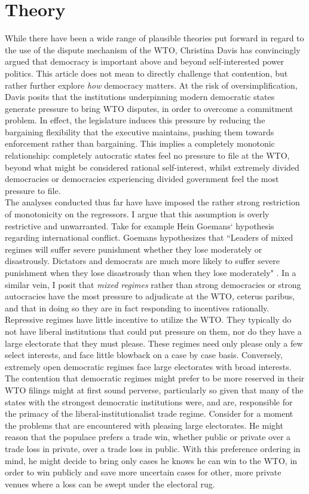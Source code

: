\documentclass[]{article}
\begin{document}
\section{Theory}
While there have been a wide range of plausible theories put forward in regard to the use of the dispute mechanism of the WTO,  Christina Davis has convincingly argued that democracy is important above and beyond self-interested power politics.  This article does not mean to directly challenge that contention, but rather further explore \textit{how} democracy matters. At the risk of oversimplification, Davis posits that the institutions underpinning modern democratic states generate pressure to bring WTO disputes, in order to overcome a commitment problem.  In effect, the legislature induces this pressure by reducing the bargaining flexibility that the executive maintains, pushing them towards enforcement rather than bargaining. This implies a completely monotonic relationship: completely autocratic states feel no pressure to file at the WTO, beyond what might be considered rational self-interest, whilst extremely divided democracies or democracies experiencing divided government feel the most pressure to file.\\	

The analyses conducted thus far have have imposed the rather strong restriction of monotonicity on the regressors. \cite{SY2003}  I argue that this assumption is overly restrictive and unwarranted. Take for example Hein Goemans` hypothesis regarding international conflict. Goemans hypothesizes that ``Leaders of mixed regimes will suffer severe punishment whether they lose moderately or disastrously. Dictators and democrats are much more likely to suffer severe punishment when they lose disastrously than when they lose moderately" \cite{GGR2000}.  In a similar vein, I posit that \textit{mixed regimes} rather than strong democracies or strong autocracies have the most pressure to adjudicate at the WTO, ceterus paribus, and that in doing so they are in fact responding to incentives rationally. Repressive regimes have little incentive to utilize the WTO. They typically do not have liberal institutions that could put pressure on them, nor do they have a large electorate that they must please. These regimes need only please only a few select interests, and face little blowback on a case by case basis. Conversely, extremely open democratic regimes face large electorates with broad interests.\\ 

The contention that democratic regimes might prefer to be more reserved in their WTO filings might at first sound perverse, particularly so given that many of the states with the strongest democratic institutions were, and are, responsible for the primacy of the liberal-institutionalist trade regime.  Consider for a moment the problems that are encountered with pleasing large electorates. He might reason that the populace prefers a trade win, whether public or private over a trade loss in private, over a trade loss in public. With this preference ordering in mind, he might decide to bring only cases he knows he can win to the WTO, in order to win publicly and save more uncertain cases for other, more private venues where a loss can be swept under the electoral rug. 
\end{document}
